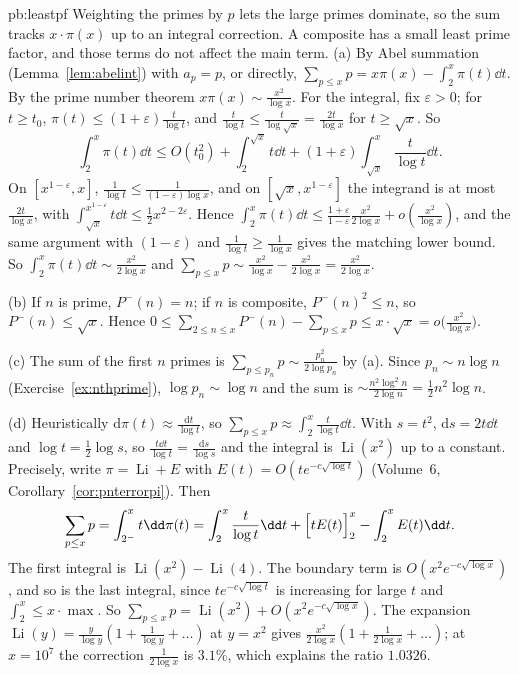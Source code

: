 \begin{solution}{pb:leastpf}
\idea Weighting the primes by $p$ lets the large primes dominate, so the sum tracks $x\cdot\pi(x)$ up to an integral correction. A composite has a small least prime factor, and those terms do not affect the main term.
\writeup (a) By Abel summation (Lemma~\ref{lem:abelint}) with $a_p=p$, or directly, $\sum_{p\le x}p=x\pi(x)-\int_2^x\pi(t)\dd t$. By the prime number theorem $x\pi(x)\sim\frac{x^2}{\log x}$.
For the integral, fix $\varepsilon>0$; for $t\ge t_0$, $\pi(t)\le(1+\varepsilon)\frac t{\log t}$, and $\frac t{\log t}\le\frac t{\log\sqrt x}=\frac{2t}{\log x}$ for $t\ge\sqrt x$. So
\[
\int_2^x\pi(t)\dd t\le O(t_0^2)+\int_2^{\sqrt x}t\dd t+(1+\varepsilon)\int_{\sqrt x}^x\frac t{\log t}\dd t.
\]
On $[x^{1-\varepsilon},x]$, $\frac1{\log t}\le\frac1{(1-\varepsilon)\log x}$, and on $[\sqrt x,x^{1-\varepsilon}]$ the integrand is at most $\frac{2t}{\log x}$, with
$\int_{\sqrt x}^{x^{1-\varepsilon}}t\dd t\le\frac12x^{2-2\varepsilon}$. Hence $\int_2^x\pi(t)\dd t\le\frac{1+\varepsilon}{1-\varepsilon}\frac{x^2}{2\log x}+o(\frac{x^2}{\log x})$, and the same argument
with $(1-\varepsilon)$ and $\frac1{\log t}\ge\frac1{\log x}$ gives the matching lower bound. So $\int_2^x\pi(t)\dd t\sim\frac{x^2}{2\log x}$ and $\sum_{p\le x}p\sim\frac{x^2}{\log x}-\frac{x^2}{2\log x}=\frac{x^2}{2\log x}$.

(b) If $n$ is prime, $P^-(n)=n$; if $n$ is composite, $P^-(n)^2\le n$, so $P^-(n)\le\sqrt x$. Hence $0\le\sum_{2\le n\le x}P^-(n)-\sum_{p\le x}p\le x\cdot\sqrt x=o\bigl(\frac{x^2}{\log x}\bigr)$.

(c) The sum of the first $n$ primes is $\sum_{p\le p_n}p\sim\frac{p_n^2}{2\log p_n}$ by (a). Since $p_n\sim n\log n$ (Exercise~\ref{ex:nthprime}), $\log p_n\sim\log n$ and the sum is
$\sim\frac{n^2\log^2n}{2\log n}=\frac12n^2\log n$.

(d) Heuristically $\mathrm d\pi(t)\approx\frac{\mathrm dt}{\log t}$, so $\sum_{p\le x}p\approx\int_2^x\frac t{\log t}\dd t$. With $s=t^2$, $\mathrm ds=2t\dd t$ and $\log t=\frac12\log s$, so
$\frac{t\dd t}{\log t}=\frac{\mathrm ds}{\log s}$ and the integral is $\operatorname{Li}(x^2)$ up to a constant. Precisely, write $\pi=\operatorname{Li}+E$ with $E(t)=O(te^{-c\sqrt{\log t}})$ (Volume~6,
Corollary~\ref{cor:pnterrorpi}). Then
\[
\sum_{p\le x}p=\int_{2^-}^xt\dd\pi(t)=\int_2^x\frac t{\log t}\dd t+\Bigl[tE(t)\Bigr]_2^x-\int_2^xE(t)\dd t.
\]
The first integral is $\operatorname{Li}(x^2)-\operatorname{Li}(4)$. The boundary term is $O(x^2e^{-c\sqrt{\log x}})$, and so is the last integral, since $te^{-c\sqrt{\log t}}$ is increasing for
large $t$ and $\int_2^x\le x\cdot\max$. So $\sum_{p\le x}p=\operatorname{Li}(x^2)+O(x^2e^{-c\sqrt{\log x}})$. The expansion $\operatorname{Li}(y)=\frac y{\log y}(1+\frac1{\log y}+\dots)$ at
$y=x^2$ gives $\frac{x^2}{2\log x}(1+\frac1{2\log x}+\dots)$; at $x=10^7$ the correction $\frac1{2\log x}$ is $3.1\%$, which explains the ratio $1.0326$.


\end{solution}
